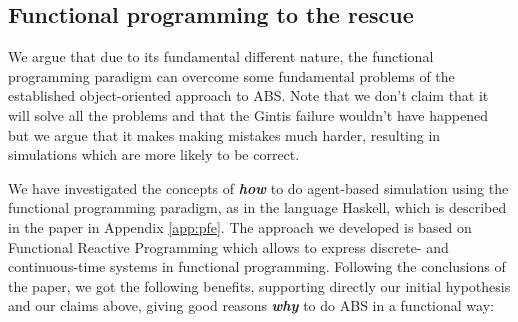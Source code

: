 \subsection{Functional programming to the rescue}
We argue that due to its fundamental different nature, the functional programming paradigm can overcome some fundamental problems of the established object-oriented approach to ABS. Note that we don't claim that it will solve all the problems and that the Gintis failure wouldn't have happened but we argue that it makes making mistakes much harder, resulting in simulations which are more likely to be correct.

We have investigated the concepts of \textbf{\textit{how}} to do agent-based simulation using the functional programming paradigm, as in the language Haskell, which is described in the paper in Appendix \ref{app:pfe}. The approach we developed is based on Functional Reactive Programming which allows to express discrete- and continuous-time systems in functional programming. Following the conclusions of the paper, we got the following benefits, supporting directly our initial hypothesis and our claims above, giving good reasons \textbf{\textit{why}} to do ABS in a functional way:

